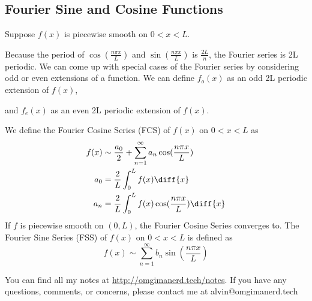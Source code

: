 \documentclass{math}
\begin{document}
\subsection*{Fourier Sine and Cosine Functions}
Suppose \( f(x) \) is piecewise smooth on \( 0<x<L \).
\begin{center}
\end{center}
Because the period of \( \cos(\frac{n\pi x}{L}) \) and
\( \sin(\frac{n\pi x}{L}) \) is \( \frac{2L}{n} \), the Fourier series is 2L
periodic. We can come up with special cases of the Fourier series by
considering odd or even extensions of a function. We can define \( f_o(x) \) as
an odd 2L periodic extension of \( f(x) \),
\begin{center}
\end{center}
and \( f_e(x) \) as an even 2L periodic extension of \( f(x) \).
\begin{center}
\end{center}
We define the Fourier Cosine Series (FCS) of \( f(x) \) on \( 0<x<L \) as
\begin{align*}
  f(x) &\sim \frac{a_0}{2}+\sum_{n=1}^{\infty}a_n\cos(\frac{n\pi x}{L}) \\
  a_0 &= \frac{2}{L}\int_{0}^{L}f(x)\diff{x} \\
  a_n &= \frac{2}{L}\int_{0}^{L}f(x)\cos(\frac{n\pi x}{L})\diff{x}
\end{align*}
If \( f \) is piecewise smooth on \( (0,L) \), the Fourier Cosine Series
converges to. The Fourier Sine Series (FSS) of \( f(x) \) on \( 0<x<L \) is
defined as
\[ f(x) \sim \sum_{n=1}^{\infty}b_n\sin(\frac{n\pi x}{L}) \]

\begin{center}
  You can find all my notes at \url{http://omgimanerd.tech/notes}. If you have
  any questions, comments, or concerns, please contact me at
  alvin@omgimanerd.tech
\end{center}
\end{document}

